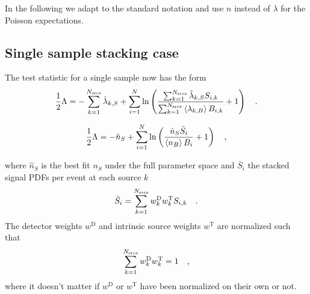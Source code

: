 In the following we adapt to the standard notation and use $n$ instead of $\lambda$ for the Poisson expectations.


\subsection{Single sample stacking case}
The test statistic for a single sample now has the form
\begin{equation}
  \frac{1}{2}\Lambda
  = -\sum_{k=1}^{N_\text{srcs}}\hat{\lambda}_{k,S} +
    \sum_{i=1}^N \ln\left(
      \frac{\sum_{k=1}^{N_\text{srcs}}\hat{\lambda}_{k,S} S_{i,k}}
           {\sum_{k=1}^{N_\text{srcs}}\Braket{\lambda_{k,B}} B_{i,k}}
      + 1 \right)
  \quad\text{.}
\label{equ:TS}
\end{equation}

\begin{align}
  \frac{1}{2}\Lambda
  = -\hat{n}_S + \sum_{i=1}^N \ln\left(\frac{\hat{n}_S\bar{S}_i}{\Braket{n_B} B_i} + 1\right) \quad\text{,}
\end{align}

where $\hat{n}_S$ is the best fit $n_S$ under the full parameter space and $\bar{S}_i$ the stacked signal PDFs per event at each source $k$
\begin{equation}
  \bar{S}_i = \sum_{k=1}^{N_\text{srcs}} w_k^\text{D} w_k^\text{T} S_{i,k} \quad\text{.}
\end{equation}
The detector weights $w^\text{D}$ and intrinsic source weights $w^\text{T}$ are normalized such that
\begin{equation}
  \sum_{k=1}^{N_\text{srcs}} w^\text{D}_k w^\text{T}_k = 1 \quad\text{,}
\end{equation}
where it doesn't matter if $w^\text{D}$ or $w^\text{T}$ have been normalized on their own or not.


